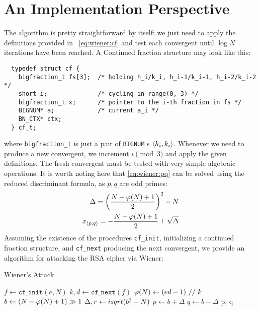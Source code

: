 \section{An Implementation Perspective}

The algorithm is pretty straightforward by itself: we just need to apply the
definitions provided in ~\ref{eq:wiener:cf} and test each convergent until
$\log N$ iterations have been reached.
A Continued fraction structure may look like this:

\begin{verbatim}
  typedef struct cf {
    bigfraction_t fs[3];  /* holding h_i/k_i, h_i-1/k_i-1, h_i-2/k_i-2 */
    short i;              /* cycling in range(0, 3) */
    bigfraction_t x;      /* pointer to the i-th fraction in fs */
    BIGNUM* a;            /* current a_i */
    BN_CTX* ctx;
  } cf_t;
\end{verbatim}
where \texttt{bigfraction\_t} is just a pair of \texttt{BIGNUM} \!s
$\langle h_i, k_i\rangle$. Whenever we need to produce a new convergent, we increment
$i \pmod{3}$ and apply the given definitions. The fresh convergent must be
tested with very simple algebraic operations. It is worth noting here that
\ref{eq:wiener:pq} can be solved using the reduced discriminant formula, as
$p, q$ are odd primes:
\begin{align*}
\Delta = \left( \frac{N-\varphi(N) + 1}{2} \right)^2 - N \\
x_{\langle p , q\rangle} = - \frac{N - \varphi(N) + 1}{2} \pm \sqrt{\Delta}
\end{align*}
Assuming the existence of the procedures \texttt{cf\_init}, initializing a
continued fraction structure, and \texttt{cf\_next} producing the next
convergent, we provide an algorithm for attacking the RSA cipher via Wiener:

\begin{algorithm}[H]
  \caption{Wiener's Attack}
  \label{alg:wiener}
  \begin{algorithmic}[1]
    \State $f \gets  \texttt{cf\_init}(e, N)$
      \State $k, d \gets \texttt{cf\_next}(f)$
        \EndIf
      \State $\varphi(N) \gets (ed - 1)\ //\ k$
        \EndIf
      \State $b \gets (N - \varphi(N) + 1) \gg 1$
      \State $\Delta, r \gets isqrt(b^2 - N)$
        \EndIf
      \State $p \gets b + \Delta$
      \State $q \gets b - \Delta$
      \State {}
    \EndFor
    \State \Return p, q
    \EndFunction
  \end{algorithmic}
\end{algorithm}


